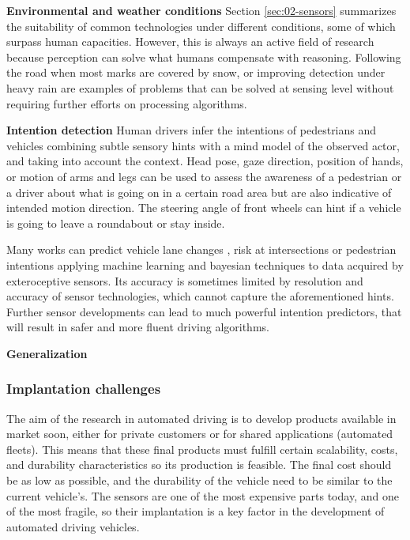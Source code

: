 \textbf{Environmental and weather conditions}    
    Section \ref{sec:02-sensors} summarizes the suitability of common 
    technologies under different conditions, some of which surpass human 
    capacities. 
    However, this is always an active field of research because perception 
    can solve what humans compensate with reasoning. Following the road 
    when most marks are covered by snow, or improving detection under heavy 
    rain are examples of problems that can be solved at sensing level
    without requiring further efforts on processing algorithms.
        
\textbf{Intention detection}        
    Human drivers infer the intentions of pedestrians and vehicles 
    combining subtle sensory hints with a mind model of the observed actor,
    and taking into account the context.
    Head pose, gaze direction, position of hands, or motion of arms and 
    legs can be used to assess the awareness of a pedestrian or a driver
    about what is going on in a certain road area but are also indicative 
    of intended motion direction. The steering angle of front wheels can
    hint if a vehicle is going to leave a roundabout or stay inside.
            
    Many works can predict vehicle lane changes \cite{Kim2017}, risk at
    intersections \cite{Lefevre2012} or pedestrian intentions
    \cite{Kohler2015,Fang2017} applying machine learning and bayesian
    techniques to data acquired by exteroceptive sensors. Its accuracy 
    is sometimes limited by resolution and accuracy of sensor technologies,
    which cannot capture the aforementioned hints.
    Further sensor developments can lead to much powerful intention 
    predictors, that will result in safer and more fluent driving 
    algorithms.
    
\textbf{Generalization}
    


\subsubsection{Implantation challenges}

The aim of the research in automated driving is to develop products available in market soon, either for private customers or for shared applications (automated fleets). This means that these final products must fulfill certain scalability, costs, and durability characteristics so its production is feasible. The final cost should be as low as possible, and the durability of the vehicle need to be similar to the current vehicle's. The sensors are one of the most expensive parts today, and one of the most fragile, so their implantation is a key factor in the development of automated driving vehicles.

